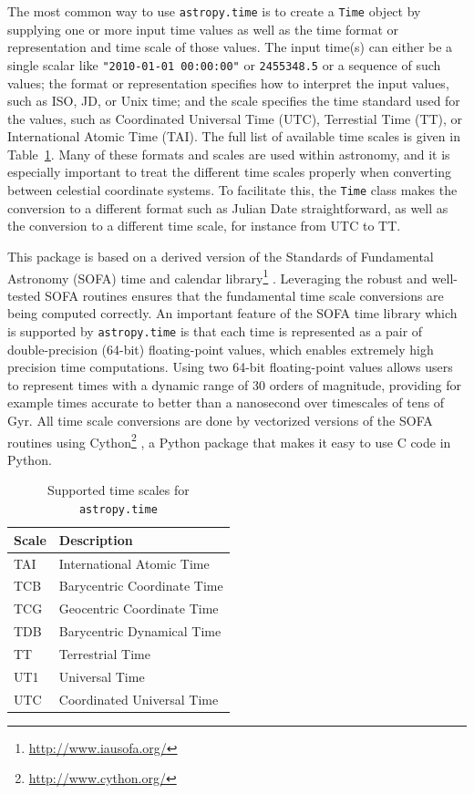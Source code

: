 \documentclass[traditabstract]{aa}
\begin{document}
The most common way to use \texttt{astropy.time} is to create a \texttt{Time}
object by supplying one or more input time values as well as the time
format or representation and time scale of those values. The input time(s) can
either be a single scalar like \verb|"2010-01-01 00:00:00"| or \verb|2455348.5|
or a sequence of such values; the format or representation specifies how to
interpret the input values, such as ISO, JD, or Unix time; and the scale
specifies the time standard used for the values, such as Coordinated Universal
Time (UTC), Terrestial Time (TT), or International Atomic Time (TAI). The full
list of available time scales is given in Table~\ref{tab:time_systems}. Many
of these formats and scales are used within astronomy, and it is especially
important to treat the different time scales properly when converting between
celestial coordinate systems. To facilitate this, the \texttt{Time} class makes
the conversion to a different format such as Julian Date straightforward, as
well as the conversion to a different time scale, for instance from UTC to TT.

This package is based on a derived version of the Standards of Fundamental
Astronomy (SOFA) time and calendar
library\footnote{\url{http://www.iausofa.org/}} \citep{sofa_wallace}.
Leveraging the robust and well-tested SOFA routines ensures that the
fundamental time scale conversions are being computed correctly. An important
feature of the SOFA time library which is supported by \texttt{astropy.time} is
that each time is represented as a pair of double-precision (64-bit)
floating-point values, which enables extremely high precision time
computations. Using two 64-bit floating-point values allows users to represent
times with a dynamic range of 30 orders of magnitude, providing for example times
accurate to better than a nanosecond over timescales of tens of Gyr. All time
scale conversions are done by vectorized versions of the SOFA routines using
Cython\footnote{\url{http://www.cython.org/}} \citep{cython}, a Python package
that makes it easy to use C code in Python.

\begin{table}
\caption{Supported time scales for \texttt{astropy.time}\label{tab:time_systems}}
\center
\begin{tabular}{ll}
\hline
Scale  & Description \\
\hline
TAI    & International Atomic Time \\
TCB    & Barycentric Coordinate Time \\
TCG    & Geocentric Coordinate Time \\
TDB    & Barycentric Dynamical Time \\
TT     & Terrestrial Time \\
UT1    & Universal Time \\
UTC    & Coordinated Universal Time \\
\hline
\end{tabular}
\end{table}
\end{document}
